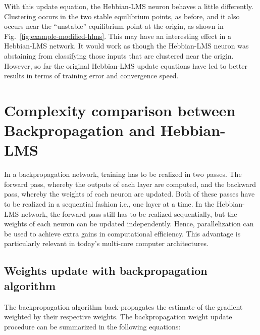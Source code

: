 \documentclass[a4paper]{article}
\begin{document}
With this update equation, the Hebbian-LMS neuron behaves a little differently. Clustering occurs in the two stable equilibrium points, as before, and it also occurs near the ``unstable'' equilibrium point at the origin, as shown in Fig.~\ref{fig:example-modified-hlms}. This may have an interesting effect in a Hebbian-LMS network. It would work as though the Hebbian-LMS neuron was abstaining from classifying those inputs that are clustered near the origin. However, so far the original Hebbian-LMS update equations have led to better results in terms of training error and convergence speed. 

\section{Complexity comparison between Backpropagation and Hebbian-LMS}

In a backpropagation network, training has to be realized in two passes. The forward pass, whereby the outputs of each layer are computed, and the backward pass, whereby the weights of each neuron are updated. Both of these passes have to be realized in a sequential fashion i.e., one layer at a time. In the Hebbian-LMS network, the forward pass still has to be realized sequentially, but the weights of each neuron can be updated independently. Hence, parallelization can be used to achieve extra gains in computational efficiency. This advantage is particularly relevant in today's multi-core computer architectures. 
	
\subsection{Weights update with backpropagation algorithm}

The backpropagation algorithm back-propagates the estimate of the gradient weighted by their respective weights. The backpropagation weight update procedure can be summarized in the following equations:
\end{document}
